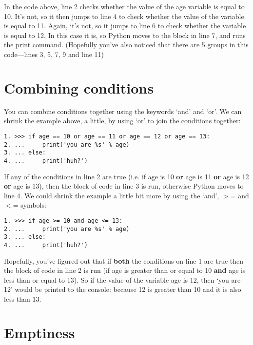 In the code above, line 2 checks whether the value of the age variable is equal to 10.  It's not, so it then jumps to line 4 to check whether the value of the  variable is equal to 11.  Again, it's not, so it jumps to line 6 to check whether the variable is equal to 12.  In this case it is, so Python moves to the block in line 7, and runs the print command.  (Hopefully you've also noticed that there are 5 groups in this code---lines 3, 5, 7, 9 and line 11)

\section{Combining conditions}
You can combine conditions together using the keywords `and' and `or'.  We can shrink the example above, a little, by using `or' to join the conditions together:

\begin{listing}
\begin{verbatim}
1. >>> if age == 10 or age == 11 or age == 12 or age == 13:
2. ...     print('you are %s' % age)
3. ... else:
4. ...     print('huh?')
\end{verbatim}
\end{listing}

If any of the conditions in line 2 are true (i.e. if age is 10 \textbf{or} age is 11 \textbf{or} age is 12 \textbf{or} age is 13), then the block of code in line 3 is run, otherwise Python moves to line 4.  We could shrink the example a little bit more by using the `and', $>$= and $<$= symbols:

\begin{listing}
\begin{verbatim}
1. >>> if age >= 10 and age <= 13:
2. ...     print('you are %s' % age)
3. ... else:
4. ...     print('huh?')
\end{verbatim}
\end{listing}

Hopefully, you've figured out that if \textbf{both} the conditions on line 1 are true then the block of code in line 2 is run (if age is greater than or equal to 10 \textbf{and} age is less than or equal to 13). So if the value of the variable age is 12, then `you are 12' would be printed to the console:  because 12 is greater than 10 and it is also less than 13.

\section{Emptiness}

